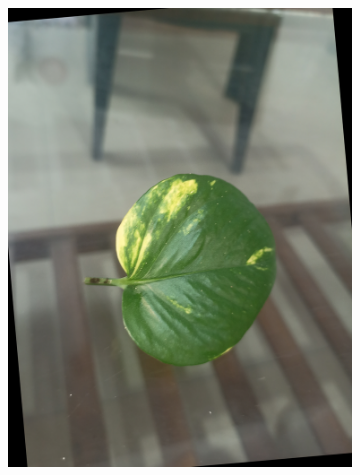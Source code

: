 \documentclass[twocolumn]{article}
\begin{document}
\begin{figure}[H]
\begin{subfigure}[b]{0.30\columnwidth}
        \includegraphics[width=\textwidth]{money5}
    \end{subfigure}
    \hfill
    \begin{subfigure}[b]{0.30\columnwidth}

\end{subfigure}
\end{figure}
\end{document}
